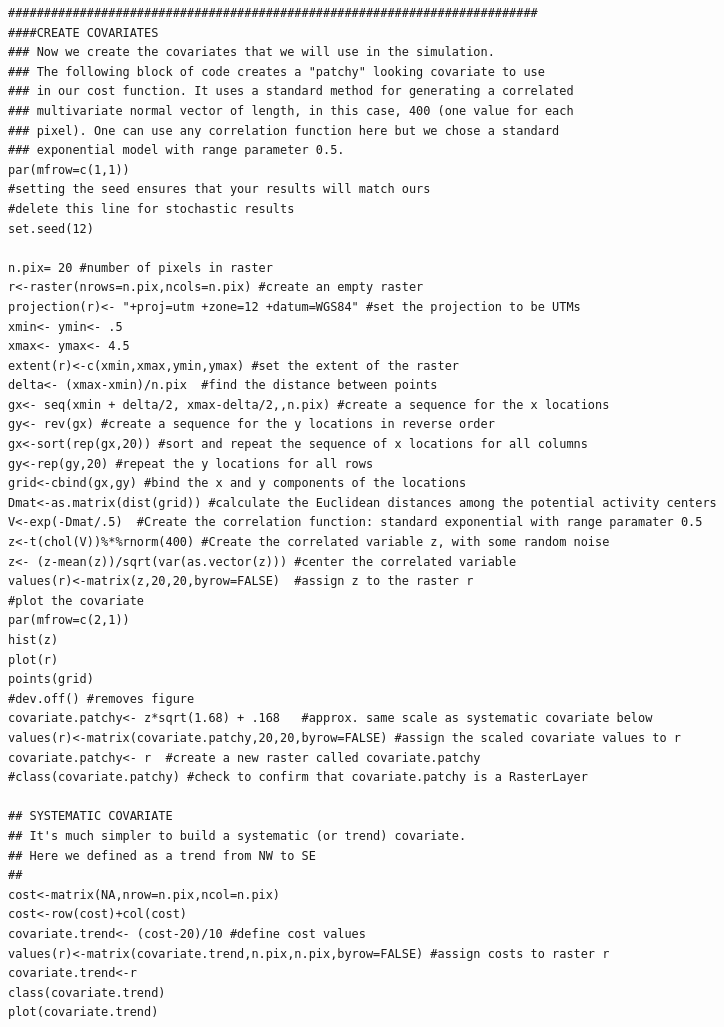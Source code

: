 \documentclass[12pt]{article}
\begin{document}
\begin{spacing}{1.2}
{\begin{verbatim}
##########################################################################
####CREATE COVARIATES
### Now we create the covariates that we will use in the simulation.
### The following block of code creates a "patchy" looking covariate to use
### in our cost function. It uses a standard method for generating a correlated
### multivariate normal vector of length, in this case, 400 (one value for each
### pixel). One can use any correlation function here but we chose a standard
### exponential model with range parameter 0.5.
par(mfrow=c(1,1))
#setting the seed ensures that your results will match ours 
#delete this line for stochastic results
set.seed(12)  

n.pix= 20 #number of pixels in raster
r<-raster(nrows=n.pix,ncols=n.pix) #create an empty raster
projection(r)<- "+proj=utm +zone=12 +datum=WGS84" #set the projection to be UTMs
xmin<- ymin<- .5
xmax<- ymax<- 4.5
extent(r)<-c(xmin,xmax,ymin,ymax) #set the extent of the raster
delta<- (xmax-xmin)/n.pix  #find the distance between points 
gx<- seq(xmin + delta/2, xmax-delta/2,,n.pix) #create a sequence for the x locations
gy<- rev(gx) #create a sequence for the y locations in reverse order
gx<-sort(rep(gx,20)) #sort and repeat the sequence of x locations for all columns
gy<-rep(gy,20) #repeat the y locations for all rows
grid<-cbind(gx,gy) #bind the x and y components of the locations
Dmat<-as.matrix(dist(grid)) #calculate the Euclidean distances among the potential activity centers 
V<-exp(-Dmat/.5)  #Create the correlation function: standard exponential with range paramater 0.5
z<-t(chol(V))%*%rnorm(400) #Create the correlated variable z, with some random noise
z<- (z-mean(z))/sqrt(var(as.vector(z))) #center the correlated variable
values(r)<-matrix(z,20,20,byrow=FALSE)  #assign z to the raster r
#plot the covariate
par(mfrow=c(2,1)) 
hist(z)
plot(r)
points(grid)
#dev.off() #removes figure
covariate.patchy<- z*sqrt(1.68) + .168   #approx. same scale as systematic covariate below
values(r)<-matrix(covariate.patchy,20,20,byrow=FALSE) #assign the scaled covariate values to r
covariate.patchy<- r  #create a new raster called covariate.patchy
#class(covariate.patchy) #check to confirm that covariate.patchy is a RasterLayer

## SYSTEMATIC COVARIATE
## It's much simpler to build a systematic (or trend) covariate.
## Here we defined as a trend from NW to SE
## 
cost<-matrix(NA,nrow=n.pix,ncol=n.pix)
cost<-row(cost)+col(cost)
covariate.trend<- (cost-20)/10 #define cost values
values(r)<-matrix(covariate.trend,n.pix,n.pix,byrow=FALSE) #assign costs to raster r
covariate.trend<-r
class(covariate.trend)
plot(covariate.trend)



\end{verbatim}}
\end{spacing}
\end{document}
